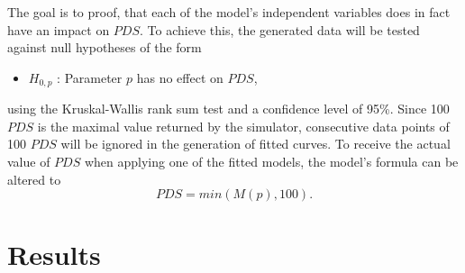 \documentclass[a4paper,12pt,twoside]{report}
\begin{document}
The goal is to proof, that each of the model's independent variables does in fact have an impact on $PDS$. To achieve this, the generated data will be tested against null hypotheses of the form

\begin{itemize}
\item[] $H_{0,p}$ : Parameter $p$ has no effect on $PDS$,
\end{itemize}
using the Kruskal-Wallis rank sum test and a confidence level of 95\%. Since 100 $PDS$ is the maximal value returned by the simulator, consecutive data points of 100 $PDS$ will be ignored in the generation of fitted curves. To receive the actual value of $PDS$ when applying one of the fitted models, the model's formula can be altered to
\begin{equation}\label{min}
PDS = min(M(p), 100).
\end{equation}
\section{Results} \label{results}
\end{document}
